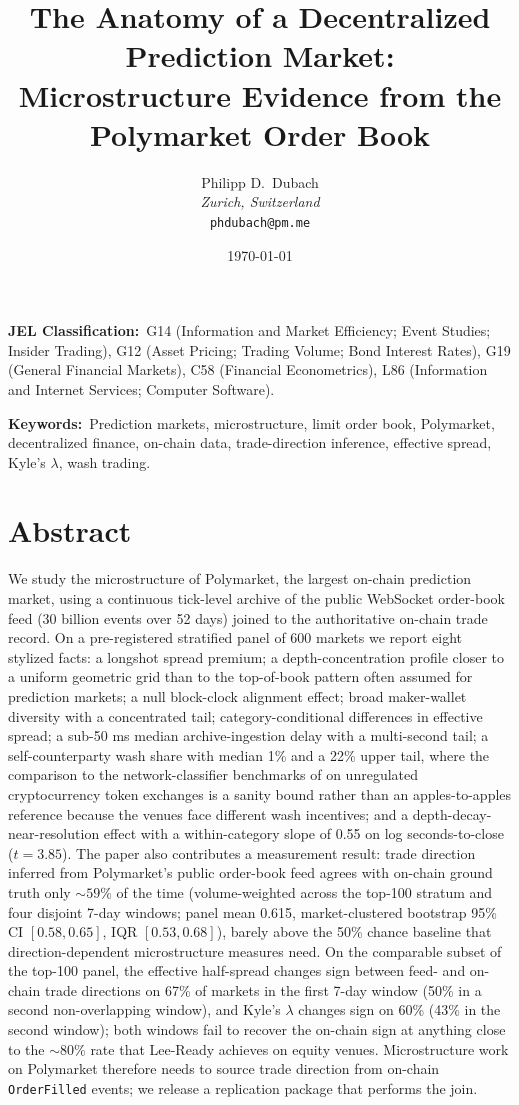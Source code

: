 \documentclass[11pt,a4paper,twocolumn]{article}
\title{The Anatomy of a Decentralized Prediction Market: \\
Microstructure Evidence from the Polymarket Order Book}
\author{Philipp D.\ Dubach \\
  \emph{Zurich, Switzerland} \\
  \texttt{phdubach@pm.me}}
\date{\today}
\begin{document}
\twocolumn[\maketitle]

\noindent\textbf{JEL Classification:}\ G14 (Information and Market
Efficiency; Event Studies; Insider Trading), G12 (Asset Pricing;
Trading Volume; Bond Interest Rates), G19 (General Financial Markets),
C58 (Financial Econometrics), L86 (Information and Internet Services;
Computer Software).

\vspace{0.5em}
\noindent\textbf{Keywords:}\ Prediction markets, microstructure,
limit order book, Polymarket, decentralized finance, on-chain data,
trade-direction inference, effective spread, Kyle's $\lambda$,
wash trading.

%
\section*{Abstract}
We study the microstructure of Polymarket, the largest on-chain
prediction market, using a continuous tick-level archive of the
public WebSocket order-book feed (30 billion events over 52 days)
joined to the authoritative on-chain trade record. On a pre-registered
stratified panel of 600 markets we report eight stylized facts: a
longshot spread premium; a depth-concentration profile closer to a
uniform geometric grid than to the top-of-book pattern often assumed
for prediction markets; a null block-clock alignment effect; broad
maker-wallet diversity with a concentrated tail; category-conditional
differences in effective spread; a sub-50 ms median archive-ingestion
delay with a multi-second tail; a self-counterparty wash share with
median 1\% and a 22\% upper tail, where the comparison to the
network-classifier benchmarks of \citet{cong-li-tang-yang-2023} on
unregulated cryptocurrency token exchanges is a sanity bound rather
than an apples-to-apples reference because the venues face different
wash incentives; and a
depth-decay-near-resolution effect with a within-category slope of
0.55 on log seconds-to-close ($t=3.85$). The paper also contributes a
measurement result: trade direction inferred from Polymarket's public
order-book feed agrees with on-chain ground truth only $\sim 59\%$
of the time (volume-weighted across the top-100 stratum and four
disjoint 7-day windows; panel mean 0.615, market-clustered bootstrap
95\% CI $[0.58, 0.65]$, IQR $[0.53, 0.68]$),
barely above the 50\% chance baseline that direction-dependent
microstructure measures need. On the comparable subset of the
top-100 panel, the effective half-spread changes sign between feed-
and on-chain trade directions on 67\% of markets in the first 7-day
window (50\% in a second non-overlapping window), and Kyle's
$\lambda$ changes sign on 60\% (43\% in the second window); both
windows fail to recover the on-chain sign at anything close to the
$\sim 80\%$ rate that Lee-Ready achieves on equity venues.
Microstructure work on Polymarket therefore
needs to source trade direction from on-chain \texttt{OrderFilled}
events; we release a replication package that performs the join.
 
\end{document}
